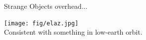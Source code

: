 \documentclass[ignorenonframetext]{beamer}
\begin{document}


\begin{frame}{Strange Objects overhead...}
\begin{center}
\texttt{[image: fig/elaz.jpg]}\\
 Consistent with something in low-earth orbit.
 \end{center}
\end{frame}
\end{document}
